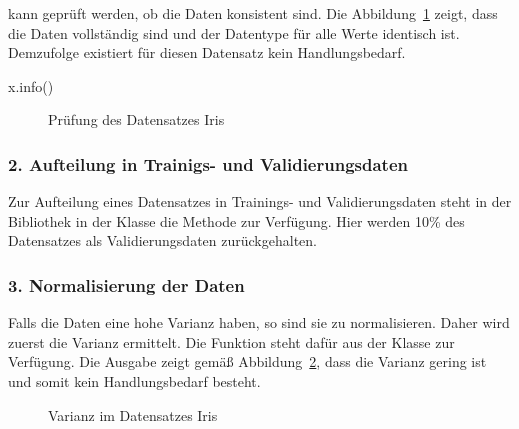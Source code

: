 \medskip


\medskip

kann geprüft werden, ob die Daten konsistent sind. Die Abbildung~\ref{TensorFlowIrisInfo} zeigt, dass die Daten vollständig sind und der Datentype für alle Werte identisch ist. Demzufolge existiert für diesen Datensatz kein Handlungsbedarf.

\medskip

x.info()

\medskip

\begin{figure}[H]
	\caption{Prüfung des Datensatzes Iris}\label{TensorFlowIrisInfo}
\end{figure}


\subsubsection{2. Aufteilung in Trainigs- und Validierungsdaten}

Zur Aufteilung eines Datensatzes  in Trainings- und Validierungsdaten steht in der Bibliothek  in der Klasse  die Methode  zur Verfügung. Hier werden 10\% des Datensatzes als Validierungsdaten zurückgehalten.

\medskip


\medskip

\subsubsection{3. Normalisierung der Daten}

Falls die Daten eine hohe Varianz haben, so sind sie zu normalisieren. Daher wird zuerst die Varianz ermittelt. Die Funktion  steht dafür aus der Klasse  zur Verfügung. Die Ausgabe zeigt gemäß Abbildung~\ref{TensorFlowIrisVar}, dass die Varianz gering ist und somit kein Handlungsbedarf besteht.

\medskip


\medskip


\begin{figure}[H]
	\caption{Varianz im Datensatzes Iris}\label{TensorFlowIrisVar}
\end{figure}

